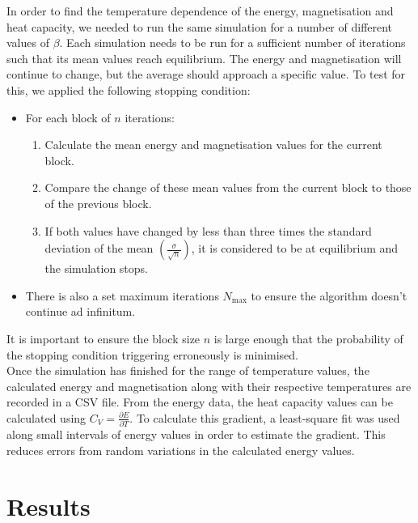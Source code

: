\documentclass[11pt]{article}
\begin{document}
	In order to find the temperature dependence of the energy, magnetisation and heat capacity, we needed to run the same simulation for a number of different values of $\beta$. Each simulation needs to be run for a sufficient number of iterations such that its mean values reach equilibrium. The energy and magnetisation will continue to change, but the average should approach a specific value. To test for this, we applied the following stopping condition:
	\begin{itemize}
		\item For each block of $n$ iterations:
		\begin{enumerate}
			\item Calculate the mean energy and magnetisation values for the current block.
			\item Compare the change of these mean values from the current block to those of the previous block.
			\item If both values have changed by less than three times the standard deviation of the mean $\displaystyle\left(\frac{\sigma}{\sqrt{n}}\right)$, it is considered to be at equilibrium and the simulation stops.
		\end{enumerate}
		\item There is also a set maximum iterations $N_\text{max}$ to ensure the algorithm doesn't continue ad infinitum.
	\end{itemize}
	It is important to ensure the block size $n$ is large enough that the probability of the stopping condition triggering erroneously is minimised. \\
	
	Once the simulation has finished for the range of temperature values, the calculated energy and magnetisation along with their respective temperatures are recorded in a CSV file. From the energy data, the heat capacity values can be calculated using $C_V = \frac{\partial E}{\partial T}$. To calculate this gradient, a least-square fit was used along small intervals of energy values in order to estimate the gradient. This reduces errors from random variations in the calculated energy values.
	
	\section{Results}
	
\end{document}

